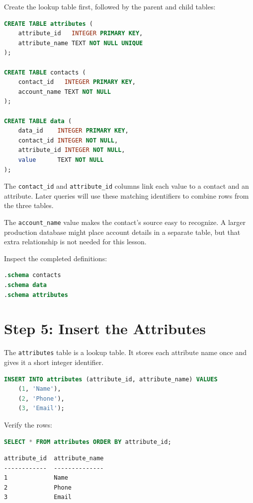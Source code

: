\documentclass[11pt]{article}
\begin{document}
Create the lookup table first, followed by the parent and child tables:

\begin{lstlisting}[language=SQL]
CREATE TABLE attributes (
    attribute_id   INTEGER PRIMARY KEY,
    attribute_name TEXT NOT NULL UNIQUE
);

CREATE TABLE contacts (
    contact_id   INTEGER PRIMARY KEY,
    account_name TEXT NOT NULL
);

CREATE TABLE data (
    data_id    INTEGER PRIMARY KEY,
    contact_id INTEGER NOT NULL,
    attribute_id INTEGER NOT NULL,
    value      TEXT NOT NULL
);
\end{lstlisting}

The \texttt{contact\_id} and \texttt{attribute\_id} columns link each value to a
contact and an attribute. Later queries will use these matching identifiers
to combine rows from the three tables.

The \texttt{account\_name} value makes the contact's source easy to recognize.
A larger production database might place account details in a separate table,
but that extra relationship is not needed for this lesson.

Inspect the completed definitions:

\begin{lstlisting}[language=SQL]
.schema contacts
.schema data
.schema attributes
\end{lstlisting}

\section*{Step 5: Insert the Attributes}

The \texttt{attributes} table is a lookup table. It stores each attribute name
once and gives it a short integer identifier.

\begin{lstlisting}[language=SQL]
INSERT INTO attributes (attribute_id, attribute_name) VALUES
    (1, 'Name'),
    (2, 'Phone'),
    (3, 'Email');
\end{lstlisting}

Verify the rows:

\begin{lstlisting}[language=SQL]
SELECT * FROM attributes ORDER BY attribute_id;
\end{lstlisting}

\begin{verbatim}
attribute_id  attribute_name
------------  --------------
1             Name
2             Phone
3             Email
\end{verbatim}
\end{document}
